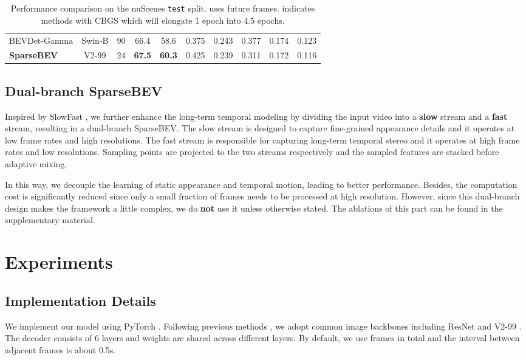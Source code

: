 \documentclass[10pt,twocolumn,letterpaper]{article}
\begin{document}
\begin{table*}[t]
\begin{tabular}{l|c|c|cc|ccccc}
    BEVDet-Gamma  \cite{bevpoolv2}  & Swin-B & 90 & 66.4 & 58.6 & 0.375 & 0.243 & 0.377 & 0.174 & 0.123 \\
    \rowcolor{Gray}
    \textbf{SparseBEV}              & V2-99 & 24 & \textbf{67.5} & \textbf{60.3} & 0.425 & 0.239 & 0.311 & 0.172 & 0.116 \\
    \bottomrule
  \end{tabular}
  \vspace{-5pt}
  \caption{Performance comparison on the nuScenes \texttt{test} split.  uses future frames.  indicates methods with CBGS \cite{cbgs} which will elongate 1 epoch into 4.5 epochs.}
  \label{table:nuscenes_test}
\end{table*}

\subsection{Dual-branch SparseBEV}

Inspired by SlowFast \cite{slowfast}, we further enhance the long-term temporal modeling by dividing the input video into a \textbf{slow} stream and a \textbf{fast} stream, resulting in a dual-branch SparseBEV.
The slow stream is designed to capture fine-grained appearance details and it operates at low frame rates and high resolutions. The fast stream is responsible for capturing long-term temporal stereo and it operates at high frame rates and low resolutions.
Sampling points are projected to the two streams respectively and the sampled features are stacked before adaptive mixing.

In this way, we decouple the learning of static appearance and temporal motion, leading to better performance. Besides, the computation cost is significantly reduced since only a small fraction of frames needs to be processed at high resolution. However, since this dual-branch design makes the framework a little complex, we do \textbf{not} use it unless otherwise stated. The ablations of this part can be found in the supplementary material.

\section{Experiments}

\subsection{Implementation Details}

We implement our model using PyTorch \cite{pytorch}. Following previous methods \cite{detr3d, bevformer, petrv2, solofusion}, we adopt common image backbones including ResNet \cite{resnet} and V2-99 \cite{vovnet2}.
The decoder consists of 6 layers and weights are shared across different layers. By default, we use  frames in total and the interval between adjacent frames is about 0.5s.
\end{document}
